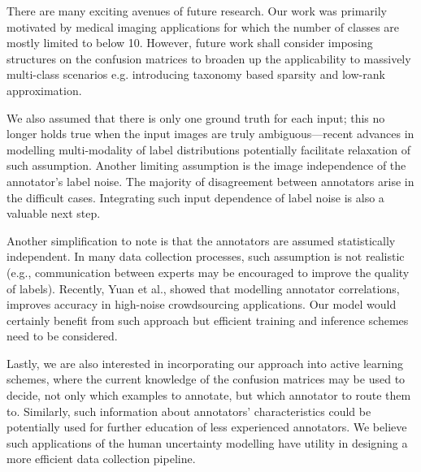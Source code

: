 There are many exciting avenues of future research. Our work was primarily motivated by medical imaging applications for which the number of classes are mostly limited to below 10. However, future work shall consider imposing structures on the confusion matrices to broaden up the applicability to massively multi-class scenarios e.g. introducing taxonomy based sparsity \cite{van2018lean} and low-rank approximation. 

We also assumed that there is only one ground truth for each input; this no longer holds true when the input images are truly ambiguous---recent advances in modelling multi-modality of label distributions \cite{saeedi2017multimodal,kohl2018probabilistic} potentially facilitate relaxation of such assumption. Another limiting assumption is the image independence of the annotator's label noise. The majority of disagreement between annotators arise in the difficult cases. Integrating such input dependence of label noise \cite{yan2010modeling,xiao2015learning} is also a valuable next step.

Another simplification to note is that the annotators are assumed statistically independent. In many data collection processes, such assumption is not realistic (e.g., communication between experts may be encouraged to improve the quality of labels). Recently, Yuan et al., \cite{li2019exploiting} showed that modelling annotator correlations,  improves accuracy in high-noise crowdsourcing applications. Our model would certainly benefit from such approach but efficient training and inference schemes need to be considered. 

Lastly, we are also interested in incorporating our approach into active learning schemes, where the current knowledge of the confusion matrices may be used to decide, not only which examples to annotate, but which annotator to route them to. Similarly, such information about annotators' characteristics could be potentially used for further education of less experienced annotators. We believe such applications of the human uncertainty modelling have utility in designing a more efficient data collection pipeline. 



